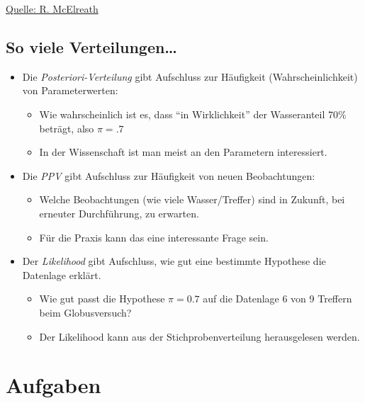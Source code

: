 \documentclass[
  a4paper,
  DIV=11]{scrreprt}
\providecommand{\tightlist}{%
  \setlength{\itemsep}{0pt}\setlength{\parskip}{0pt}}\usepackage{longtable,booktabs,array}
\theoremstyle{definition}
\theoremstyle{remark}
\begin{document}
\href{https://twitter.com/rlmcelreath/status/1448978045247893505}{Quelle:
R. McElreath}

\hypertarget{so-viele-verteilungen}{%
\subsection{So viele Verteilungen\ldots{}}\label{so-viele-verteilungen}}

\begin{itemize}
\tightlist
\item
  Die \emph{Posteriori-Verteilung} gibt Aufschluss zur Häufigkeit
  (Wahrscheinlichkeit) von Parameterwerten:

  \begin{itemize}
  \tightlist
  \item
    Wie wahrscheinlich ist es, dass ``in Wirklichkeit'' der Wasseranteil
    70\% beträgt, also \(\pi=.7\)
  \item
    In der Wissenschaft ist man meist an den Parametern interessiert.
  \end{itemize}
\item
  Die \emph{PPV} gibt Aufschluss zur Häufigkeit von neuen Beobachtungen:

  \begin{itemize}
  \tightlist
  \item
    Welche Beobachtungen (wie viele Wasser/Treffer) sind in Zukunft, bei
    erneuter Durchführung, zu erwarten.
  \item
    Für die Praxis kann das eine interessante Frage sein.
  \end{itemize}
\item
  Der \emph{Likelihood} gibt Aufschluss, wie gut eine bestimmte
  Hypothese die Datenlage erklärt.

  \begin{itemize}
  \tightlist
  \item
    Wie gut passt die Hypothese \(\pi=0.7\) auf die Datenlage 6 von 9
    Treffern beim Globusversuch?
  \item
    Der Likelihood kann aus der Stichprobenverteilung herausgelesen
    werden.
  \end{itemize}
\end{itemize}

\hypertarget{aufgaben-5}{%
\section{Aufgaben}\label{aufgaben-5}}
\end{document}
